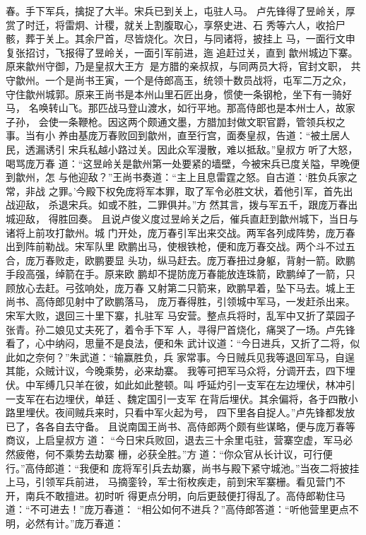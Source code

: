 春。手下军兵，擒捉了大半。宋兵已到关上，屯驻人马。
卢先锋得了昱岭关，厚赏了时迁，将雷炯、计稷，就关上割腹取心，享祭史进、石
秀等六人，收拾尸骸，葬于关上。其余尸首，尽皆烧化。次日，与同诸将，披挂上
马，一面行文申复张招讨，飞报得了昱岭关，一面引军前进，迤追赶过关，直到
歙州城边下寨。
原来歙州守御，乃是皇叔大王方，是方腊的亲叔叔，与同两员大将，官封文职，
共守歙州。一个是尚书王寅，一个是侍郎高玉，统领十数员战将，屯军二万之众，
守住歙州城郭。原来王尚书是本州山里石匠出身，惯使一条钢枪，坐下有一骑好马，
名唤转山飞。那匹战马登山渡水，如行平地。那高侍郎也是本州士人，故家子孙，
会使一条鞭枪。因这两个颇通文墨，方腊加封做文职官爵，管领兵权之事。当有小
养由基庞万春败回到歙州，直至行宫，面奏皇叔，告道：“被土居人民，透漏诱引
宋兵私越小路过关。因此众军漫散，难以抵敌。”皇叔方听了大怒，喝骂庞万春
道：“这昱岭关是歙州第一处要紧的墙壁，今被宋兵已度关隘，早晚便到歙州，怎
与他迎敌？”王尚书奏道：“主上且息雷霆之怒。自古道：‘胜负兵家之常，非战
之罪。’今殿下权免庞将军本罪，取了军令必胜文状，着他引军，首先出战迎敌，
杀退宋兵。如或不胜，二罪俱并。”方然其言，拨与军五千，跟庞万春出城迎敌，
得胜回奏。
且说卢俊义度过昱岭关之后，催兵直赶到歙州城下，当日与诸将上前攻打歙州。城
门开处，庞万春引军出来交战。两军各列成阵势，庞万春出到阵前勒战。宋军队里
欧鹏出马，使根铁枪，便和庞万春交战。两个斗不过五合，庞万春败走，欧鹏要显
头功，纵马赶去。庞万春扭过身躯，背射一箭。欧鹏手段高强，绰箭在手。原来欧
鹏却不提防庞万春能放连珠箭，欧鹏绰了一箭，只顾放心去赶。弓弦响处，庞万春
又射第二只箭来，欧鹏早着，坠下马去。城上王尚书、高侍郎见射中了欧鹏落马，
庞万春得胜，引领城中军马，一发赶杀出来。宋军大败，退回三十里下寨，扎驻军
马安营。整点兵将时，乱军中又折了菜园子张青。孙二娘见丈夫死了，着令手下军
人，寻得尸首烧化，痛哭了一场。卢先锋看了，心中纳闷，思量不是良法，便和朱
武计议道：“今日进兵，又折了二将，似此如之奈何？”朱武道：“输赢胜负，兵
家常事。今日贼兵见我等退回军马，自逞其能，众贼计议，今晚乘势，必来劫寨。
我等可把军马众将，分调开去，四下埋伏。中军缚几只羊在彼，如此如此整顿。叫
呼延灼引一支军在左边埋伏，林冲引一支军在右边埋伏，单廷、魏定国引一支军
在背后埋伏。其余偏将，各于四散小路里埋伏。夜间贼兵来时，只看中军火起为号，
四下里各自捉人。”卢先锋都发放已了，各各自去守备。
且说南国王尚书、高侍郎两个颇有些谋略，便与庞万春等商议，上启皇叔方道：
“今日宋兵败回，退去三十余里屯驻，营寨空虚，军马必然疲倦，何不乘势去劫寨
栅，必获全胜。”方道：“你众官从长计议，可行便行。”高侍郎道：“我便和
庞将军引兵去劫寨，尚书与殿下紧守城池。”当夜二将披挂上马，引领军兵前进，
马摘銮铃，军士衔枚疾走，前到宋军寨栅。看见营门不开，南兵不敢擅进。初时听
得更点分明，向后更鼓便打得乱了。高侍郎勒住马道：“不可进去！”庞万春道：
“相公如何不进兵？”高侍郎答道：“听他营里更点不明，必然有计。”庞万春道：
